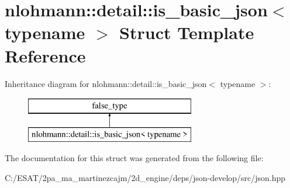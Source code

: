 \hypertarget{structnlohmann_1_1detail_1_1is__basic__json}{}\section{nlohmann\+:\+:detail\+:\+:is\+\_\+basic\+\_\+json$<$ typename $>$ Struct Template Reference}
\label{structnlohmann_1_1detail_1_1is__basic__json}
Inheritance diagram for nlohmann\+:\+:detail\+:\+:is\+\_\+basic\+\_\+json$<$ typename $>$\+:\begin{figure}[H]
\begin{center}
\leavevmode
\includegraphics[height=2.000000cm]{structnlohmann_1_1detail_1_1is__basic__json}
\end{center}
\end{figure}


The documentation for this struct was generated from the following file\+:\begin{DoxyCompactItemize}
\item 
C\+:/\+E\+S\+A\+T/2pa\+\_\+ma\+\_\+martinezcajm/2d\+\_\+engine/deps/json-\/develop/src/json.\+hpp\end{DoxyCompactItemize}
